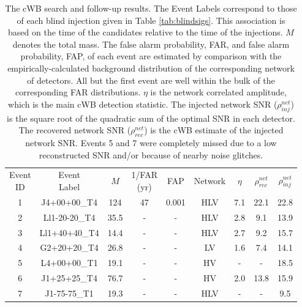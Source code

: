 \begin{table}
\caption{\label{tab:cWBEvents} The cWB search and follow-up results.
The Event Labels correspond to those of each blind injection given in
Table \ref{tab:blindsigs}. This association is based on the time of
the candidates relative to the time of the injections. $M$ denotes the
total mass. The false alarm probability, FAR, and false alarm probability, FAP, 
of each event are
estimated by comparison with the empirically-calculated background
distribution of the corresponding network of detectors. All but the first event 
are well within the bulk of the
corresponding FAR distributions. $\eta$ is the network correlated amplitude, 
which is
the main cWB detection statistic.  The injected network SNR
($\rho_{inj}^{net}$) is the square root of the quadratic sum of the
optimal SNR in each detector. The recovered network SNR
($\rho_{rec}^{net}$) is the cWB estimate of the injected network SNR.
Events 5 and 7 were completely missed due to a low reconstructed SNR
and/or because of nearby noise glitches.}
\begin{tabular}{@{}ccccccccc}
 \subrows{Event\\ID} &    \subrows{Event\\Label} &  $M$ & \subrows{1/FAR\\(yr)} 
& FAP & Network & 
$\eta$ & $\rho_{rec}^{net}$ & $\rho_{inj}^{net}$ \\
 1 &  J4+00+00\_T4 & 124 & 47 & 0.001 & HLV & 7.1 & 22.1 & 22.8 \\ 
 2 &  Ll1-20-20\_T4 & 35.5 & -  & -   & HLV & 2.8 & 9.1  & 13.9 \\  	
 3 &  Ll1+40+40\_T4 &  14.4 & -  & -   & HLV & 2.7 & 9.2  & 15.7 \\
 4 &  G2+20+20\_T4 & 26.8 & -  & -   & LV  & 1.6 & 7.4  & 14.1 \\
 5 &  L4+00+00\_T1 & 19.1 & -  & -   & HV  & - & - & 18.5 \\
 6 &  J1+25+25\_T4 & 76.7 & -  & -   & HV  & 2.0 & 13.8 & 15.9 \\
 7 &  J1-75-75\_T1 & 19.3 & -  & -   & HLV  & - & - & 9.5 \\
\end{tabular}
\end{table}

\subsection{\ihope{}}
\label{ssec:ihope_results}

